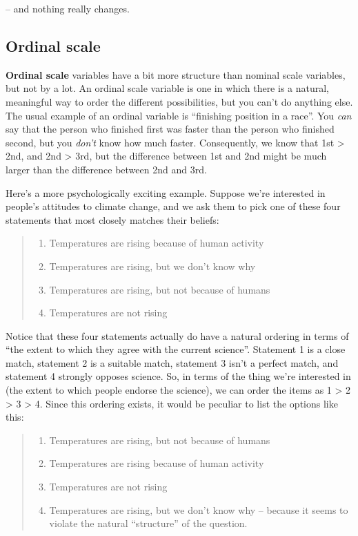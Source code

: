 \documentclass[
]{book}
\providecommand{\tightlist}{%
  \setlength{\itemsep}{0pt}\setlength{\parskip}{0pt}}
\theoremstyle{definition}
\theoremstyle{definition}
\theoremstyle{definition}
\theoremstyle{definition}
\theoremstyle{remark}
\begin{document}
-- and nothing really changes.

\hypertarget{ordinalscale}{%
\subsection{Ordinal scale}\label{ordinalscale}}

\textbf{Ordinal scale} variables have a bit more structure than nominal scale variables, but not by a lot. An ordinal scale variable is one in which there is a natural, meaningful way to order the different possibilities, but you can't do anything else. The usual example of an ordinal variable is ``finishing position in a race''. You \emph{can} say that the person who finished first was faster than the person who finished second, but you \emph{don't} know how much faster. Consequently, we know that 1st \textgreater{} 2nd, and 2nd \textgreater{} 3rd, but the difference between 1st and 2nd might be much larger than the difference between 2nd and 3rd.

Here's a more psychologically exciting example. Suppose we're interested in people's attitudes to climate change, and we ask them to pick one of these four statements that most closely matches their beliefs:

\begin{quote}
\begin{enumerate}
\def\labelenumi{(\arabic{enumi})}
\tightlist
\item
  Temperatures are rising because of human activity
\item
  Temperatures are rising, but we don't know why
\item
  Temperatures are rising, but not because of humans
\item
  Temperatures are not rising
\end{enumerate}
\end{quote}

Notice that these four statements actually do have a natural ordering in terms of ``the extent to which they agree with the current science''. Statement 1 is a close match, statement 2 is a suitable match, statement 3 isn't a perfect match, and statement 4 strongly opposes science. So, in terms of the thing we're interested in (the extent to which people endorse the science), we can order the items as 1 \textgreater{} 2 \textgreater{} 3 \textgreater{} 4. Since this ordering exists, it would be peculiar to list the options like this:

\begin{quote}
\begin{enumerate}
\def\labelenumi{(\arabic{enumi})}
\setcounter{enumi}{2}
\tightlist
\item
  Temperatures are rising, but not because of humans
\item
  Temperatures are rising because of human activity
\item
  Temperatures are not rising
\item
  Temperatures are rising, but we don't know why
  -- because it seems to violate the natural ``structure'' of the question.
\end{enumerate}
\end{quote}
\end{document}
